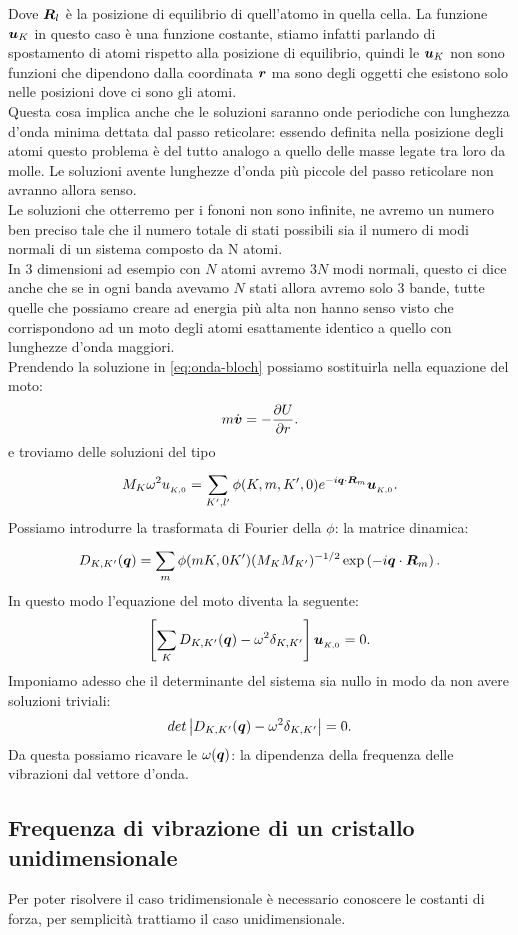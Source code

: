 Dove $\boldsymbol{R}_l$	è la posizione di equilibrio di quell'atomo in quella cella. 
La funzione $\boldsymbol{u}_{K}$ in questo caso è una funzione costante, stiamo infatti parlando di spostamento di atomi rispetto alla posizione di equilibrio,
quindi le $\boldsymbol{u}_{K}$ non sono funzioni che dipendono dalla coordinata $\boldsymbol{r}$ ma sono degli oggetti che esistono solo nelle posizioni dove ci sono gli atomi.\\
Questa cosa implica anche che le soluzioni saranno onde periodiche con lunghezza d'onda minima dettata dal passo reticolare: essendo definita nella posizione degli atomi questo problema è del tutto analogo a quello delle masse legate tra loro da molle. 
Le soluzioni avente lunghezze d'onda più piccole del passo reticolare non avranno allora senso. \\
Le soluzioni che otterremo per i fononi non sono infinite, ne avremo un numero ben preciso tale che il numero totale di stati possibili sia il numero di modi normali di un sistema composto da N atomi.\\
In 3 dimensioni ad esempio con $N$ atomi avremo $3N$ modi normali, questo ci dice anche che se in ogni banda avevamo $N$ stati allora avremo solo 3 bande, tutte quelle che possiamo creare ad energia più alta non hanno senso visto che corrispondono ad un moto degli atomi esattamente identico a quello con lunghezze d'onda maggiori.\\
Prendendo la soluzione in \ref{eq:onda-bloch} possiamo sostituirla nella equazione del moto:
\[
	m\dot{\boldsymbol{v}} = -\frac{\partial U}{\partial r} 
.\] 
e troviamo delle soluzioni del tipo
\[
	M_{K} \omega ^2 u_{_{K,0}} 
	=
	\sum_{K',l'}^{} \phi(K,m,K',0) e^{-i \boldsymbol{q}\cdot\boldsymbol{R}_m} \boldsymbol{u}_{_{K,0}}
.\] 
Possiamo introdurre la trasformata di Fourier della $\phi$: la matrice dinamica:
\[
	D_{K,K'}(\boldsymbol{q}) = 
	\sum_{m}^{} 
	\phi(mK,0K')(M_{K}M_{K'})^{-1/2}
	\exp\left( -i\boldsymbol{q}\cdot\boldsymbol{R}_m \right) 
.\] 
In questo modo l'equazione del moto diventa la seguente:
\[
	\left[ \sum_{K}^{} D_{K,K'}(\boldsymbol{q}) - \omega ^2  \delta_{K,K'} \right]
	\boldsymbol{u}_{_{K,0}}=0
.\] 
Imponiamo adesso che il determinante del sistema sia nullo in modo da non avere soluzioni triviali:
\[
	det\left| D_{K,K'}(\boldsymbol{q}) -\omega ^2 \delta_{K,K'} \right| =0
.\] 
Da questa possiamo ricavare le $\omega (\boldsymbol{q})$: la dipendenza della frequenza delle vibrazioni dal vettore d'onda.
\subsection{Frequenza di vibrazione di un cristallo unidimensionale}
\label{subsec:Frequenza di vibrazione di un cristallo unidimensionale}
Per poter risolvere il caso tridimensionale è necessario conoscere le costanti di forza, per semplicità trattiamo il caso unidimensionale.
